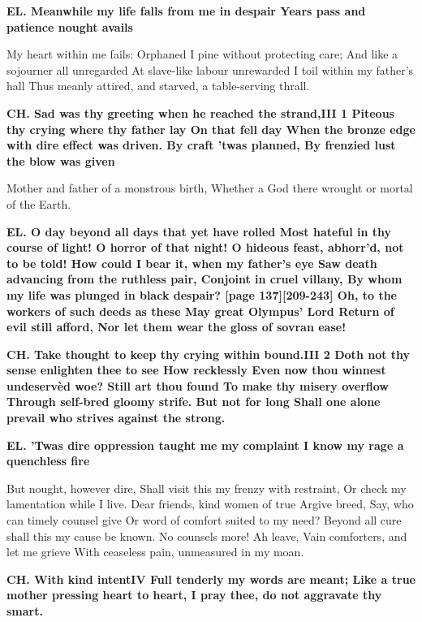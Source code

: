 \documentclass[11pt,letter]{book}
\begin{document}
\par \textbf{EL. Meanwhile my life falls from me in despair Years pass and patience nought avails}
\par   My heart within me fails:  Orphaned I pine without protecting care; And like a sojourner all unregarded At slave-like labour unrewarded I toil within my father’s hall Thus meanly attired, and starved, a table-serving thrall.

\par \textbf{CH. Sad was thy greeting when he reached the strand,III 1 Piteous thy crying where thy father lay On that fell day When the bronze edge with dire effect was driven. By craft ’twas planned, By frenzied lust the blow was given}
\par   Mother and father of a monstrous birth, Whether a God there wrought or mortal of the Earth.

\par \textbf{EL. O day beyond all days that yet have rolled Most hateful in thy course of light! O horror of that night! O hideous feast, abhorr’d, not to be told! How could I bear it, when my father’s eye Saw death advancing from the ruthless pair, Conjoint in cruel villany, By whom my life was plunged in black despair? [page 137][209-243] Oh, to the workers of such deeds as these May great Olympus’ Lord Return of evil still afford, Nor let them wear the gloss of sovran ease!}
\par 

\par \textbf{CH. Take thought to keep thy crying within bound.III 2 Doth not thy sense enlighten thee to see How recklessly Even now thou winnest undeservèd woe? Still art thou found To make thy misery overflow Through self-bred gloomy strife. But not for long Shall one alone prevail who strives against the strong.}
\par 

\par \textbf{EL. ’Twas dire oppression taught me my complaint I know my rage a quenchless fire}
\par   But nought, however dire, Shall visit this my frenzy with restraint, Or check my lamentation while I live. Dear friends, kind women of true Argive breed, Say, who can timely counsel give Or word of comfort suited to my need? Beyond all cure shall this my cause be known. No counsels more! Ah leave, Vain comforters, and let me grieve With ceaseless pain, unmeasured in my moan.

\par \textbf{CH. With kind intentIV Full tenderly my words are meant; Like a true mother pressing heart to heart, I pray thee, do not aggravate thy smart.}
\par 
\end{document}
